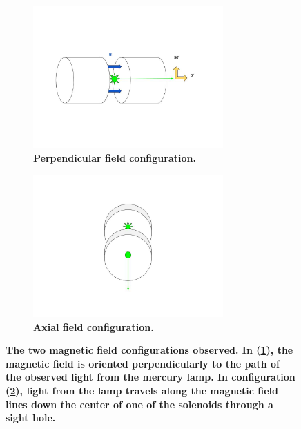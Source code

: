 \documentclass[twocolumn]{article}
\begin{document}
	\begin{figure}[t]
		\centering
		\begin{subfigure}{0.55\textwidth}
			\includegraphics[width = 0.8\textwidth]{Images/FieldConfigA.jpg}
			\caption{\textbf{Perpendicular field configuration.}}
			\label{subfig:PerpFieldConfig}
		\end{subfigure}%
		\begin{subfigure}{0.55\textwidth}
			\centering
			\includegraphics[width=0.8\textwidth]{Images/FieldConfigB.jpg}
			\caption{\textbf{Axial field configuration.}}
			\label{subfig:AxialFieldConfig}
		\end{subfigure}%
		\caption{\textbf{The two magnetic field configurations observed. In (\ref{subfig:PerpFieldConfig}), the magnetic field is oriented perpendicularly to the path of the observed light from the mercury lamp. In configuration (\ref{subfig:AxialFieldConfig}), light from the lamp travels along the magnetic field lines down the center of one of the solenoids through a sight hole.}}
		\label{fig:FieldConfig}
	\end{figure}
	
\end{document}
